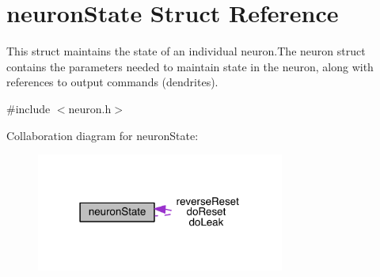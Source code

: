 \hypertarget{structneuron_state}{}\section{neuron\+State Struct Reference}
\label{structneuron_state}


This struct maintains the state of an individual neuron.\+The neuron struct contains the parameters needed to maintain state in the neuron, along with references to output commands (dendrites).  




{\ttfamily \#include $<$neuron.\+h$>$}



Collaboration diagram for neuron\+State\+:\nopagebreak
\begin{figure}[H]
\begin{center}
\leavevmode
\includegraphics[width=231pt]{structneuron_state__coll__graph}
\end{center}
\end{figure}
